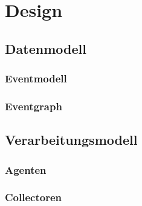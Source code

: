 %

\chapter{Design}

\section{Datenmodell}
\subsection{Eventmodell}
\subsection{Eventgraph}
\section{Verarbeitungsmodell}
\subsection{Agenten}
\subsection{Collectoren}

